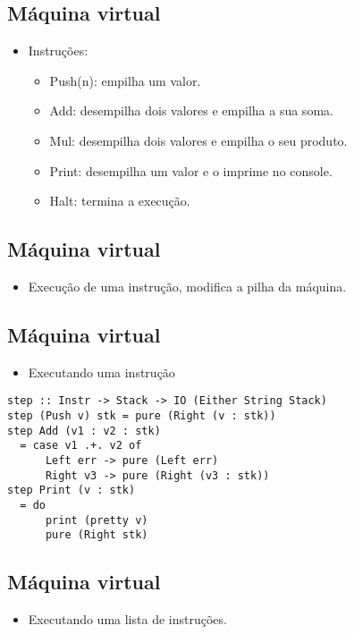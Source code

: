 \documentclass[11pt]{article}
\begin{document}
\subsection*{Máquina virtual}
\label{sec:org4b32555}

\begin{itemize}
\item Instruções:
\begin{itemize}
\item Push(n): empilha um valor.
\item Add: desempilha dois valores e empilha a sua soma.
\item Mul: desempilha dois valores e empilha o seu produto.
\item Print: desempilha um valor e o imprime no console.
\item Halt: termina a execução.
\end{itemize}
\end{itemize}
\subsection*{Máquina virtual}
\label{sec:orgb92527a}

\begin{itemize}
\item Execução de uma instrução, modifica a pilha da máquina.
\end{itemize}
\subsection*{Máquina virtual}
\label{sec:org49f38da}

\begin{itemize}
\item Executando uma instrução
\end{itemize}

\begin{verbatim}
step :: Instr -> Stack -> IO (Either String Stack)
step (Push v) stk = pure (Right (v : stk))
step Add (v1 : v2 : stk)
  = case v1 .+. v2 of 
      Left err -> pure (Left err)
      Right v3 -> pure (Right (v3 : stk))
step Print (v : stk)
  = do 
      print (pretty v)
      pure (Right stk) 
\end{verbatim}
\subsection*{Máquina virtual}
\label{sec:org61804f7}

\begin{itemize}
\item Executando uma lista de instruções.
\end{itemize}
\end{document}
